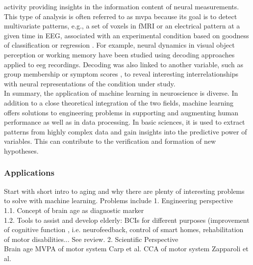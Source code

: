 activity providing insights in the information content of neural measurements. This type of analysis is often referred to as \gls{mvpa} because its goal is to detect multivariate patterns, e.g., a set of voxels in fMRI or an electrical pattern at a given time in EEG, associated with an experimental condition based on goodness of classification or regression \cite{Holdgraf2017}. For example, neural dynamics in visual object perception \cite{Cauchoix2014} or working memory \cite{Bae2018} have been studied using decoding approaches applied to \gls{eeg} recordings. Decoding was also linked to another variable, such as group membership \cite{Csizmadia2021, Bae2020} or symptom scores \cite{Coutanche2011} , to reveal interesting interrelationships with neural representations of the condition under study.\\
In summary, the application of machine learning in neuroscience is diverse. In addition to a close theoretical integration of the two fields, machine learning offers solutions to engineering problems in supporting and augmenting human performance as well as in data processing. In basic sciences, it is used to extract patterns from highly complex data and gain insights into the predictive power of variables. This can contribute to the verification and formation of new hypotheses.




\subsubsection{Applications}
Start with short intro to aging and why there are plenty of interesting problems to solve with machine learning. Problems include
1. Engineering perspective\\
1.1. Concept of brain age as diagnostic marker\\  
1.2. Tools to assist and develop elderly: BCIs for different purposes (improvement of cognitive function  , i.e. neurofeedback, control of smart homes, rehabilitation of motor disabilities... See review. 
2. Scientific Perspective\\
Brain age 
MVPA of motor system Carp et al. 
CCA of motor system Zapparoli et al.




